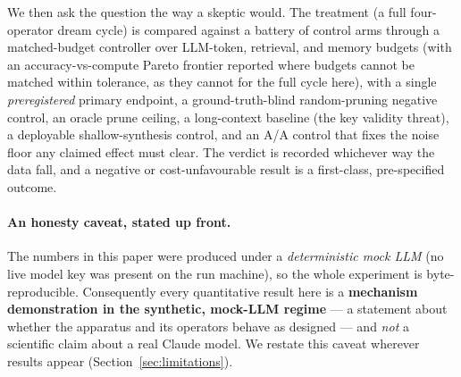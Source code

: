 We then ask the question the way a skeptic would. The treatment (a full
four-operator dream cycle) is compared against a battery of \SWnArms{} control
arms through a matched-budget controller over LLM-token, retrieval, and memory
budgets (with an accuracy-vs-compute Pareto frontier reported where budgets
cannot be matched within tolerance, as they cannot for the full cycle here), with
a single \emph{preregistered} primary endpoint, a ground-truth-blind
random-pruning negative control, an oracle prune ceiling, a long-context baseline
(the key validity threat), a deployable shallow-synthesis control, and an A/A
control that fixes the noise floor any claimed effect must clear. The verdict is recorded whichever way the data fall, and a
negative or cost-unfavourable result is a first-class, pre-specified outcome.

\paragraph{An honesty caveat, stated up front.} The numbers in this paper were
produced under a \emph{deterministic mock LLM} (no live model key was present on
the run machine), so the whole experiment is byte-reproducible. Consequently
every quantitative result here is a \textbf{mechanism demonstration in the
synthetic, mock-LLM regime} --- a statement about whether the apparatus and its
operators behave as designed --- and \emph{not} a scientific claim about a real
Claude model. We restate this caveat wherever results appear
(Section~\ref{sec:limitations}).


